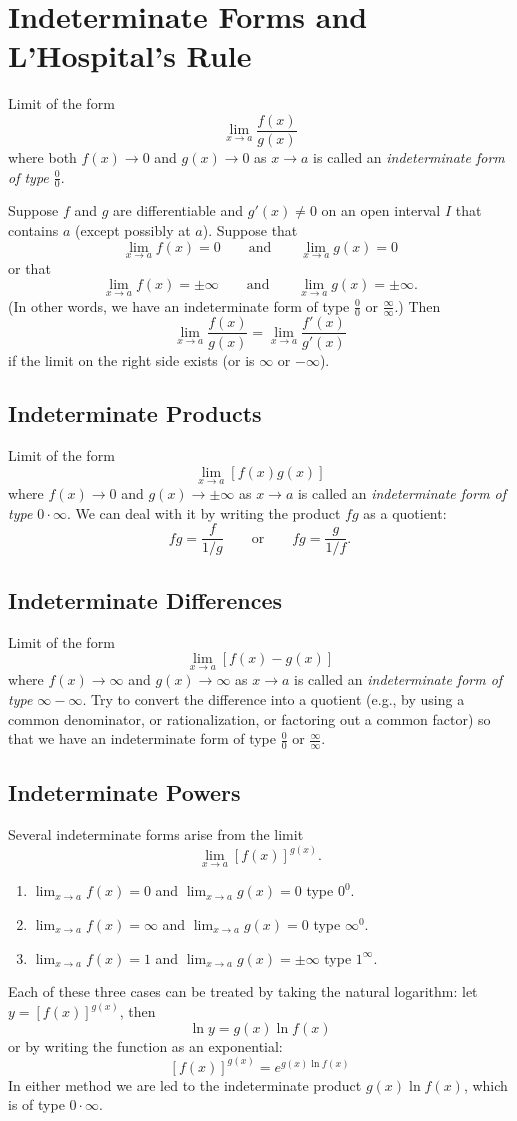 \section{Indeterminate Forms and L'Hospital's Rule}
Limit of the form
\[
\lim_{x\to a}\frac{f(x)}{g(x)}
\]
where both $f(x)\to 0$ and $g(x)\to 0$ as $x\to a$ is called an
\emph{indeterminate form of type $\frac{0}{0}$}.
\begin{theorem}
Suppose $f$ and $g$ are differentiable and $g'(x)\neq 0$ on an
open interval $I$ that contains $a$ (except possibly at
$a$). Suppose that
\[
\lim_{x\to a}f(x)=0\qquad\text{and}\qquad\lim_{x\to a}g(x)=0
\]
or that
\[
\lim_{x\to a}f(x)=\pm\infty\qquad\text{and}\qquad\lim_{x\to a}g(x)=\pm\infty.
\]
(In other words, we have an indeterminate form of type
$\frac{0}{0}$ or $\frac{\infty}{\infty}$.) Then
\[
\lim_{x\to a}\frac{f(x)}{g(x)}=\lim_{x\to a}\frac{f'(x)}{g'(x)}
\]
if the limit on the right side exists (or is $\infty$ or $-\infty$).
\end{theorem}
\subsection{Indeterminate Products}
Limit of the form
\[
\lim_{x\to a}[f(x)g(x)]
\]
where $f(x)\to 0$ and $g(x)\to \pm\infty$ as $x\to a$ is called an
\emph{indeterminate form of type $0\cdot\infty$}. We can deal
with it by writing the product $fg$ as a quotient:
\[
fg=\frac{f}{1/g}\qquad\text{or}\qquad fg=\frac{g}{1/f}.
\]
\subsection{Indeterminate Differences}
Limit of the form
\[
\lim_{x\to a}[f(x)-g(x)]
\]
where $f(x)\to \infty$ and $g(x)\to\infty$ as $x\to a$ is called an
\emph{indeterminate form of type $\infty-\infty$}. Try to convert
the difference into a quotient (e.g., by using a common
denominator, or rationalization, or factoring out a common
factor) so that we have an indeterminate form of type
$\frac{0}{0}$ or $\frac{\infty}{\infty}$.
\subsection{Indeterminate Powers}
Several indeterminate forms arise from the limit
\[
\lim_{x\to a}[f(x)]^{g(x)}.
\]
\begin{enumerate}[noitemsep,label=\arabic*.]
\item $\lim_{x\to a}f(x)=0$ and $\lim_{x\to a}g(x)=0$ type $0^0$.
\item $\lim_{x\to a}f(x)=\infty$ and $\lim_{x\to a}g(x)=0$ type
  $\infty^0$.
\item $\lim_{x\to a}f(x)=1$ and $\lim_{x\to a}g(x)=\pm\infty$
  type $1^\infty$.
\end{enumerate}
Each of these three cases can be treated by taking the natural
logarithm: let $y=[f(x)]^{g(x)}$, then
\[
\ln y=g(x)\ln f(x)
\]
or by writing the function as an exponential:
\[
[f(x)]^{g(x)}=e^{g(x)\ln f(x)}
\]
In either method we are led to the indeterminate product $g(x)\ln
f(x)$, which is of type $0\cdot\infty$.
